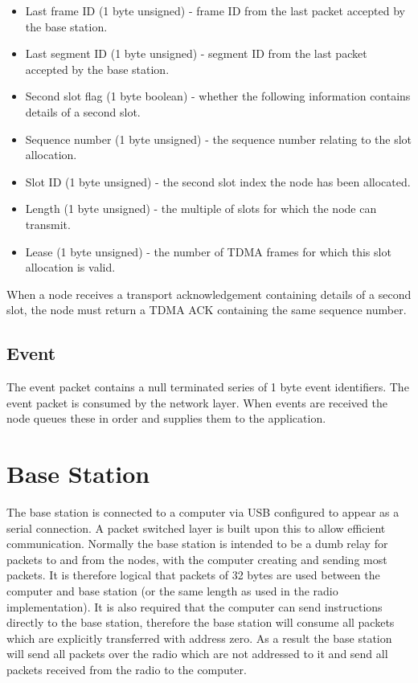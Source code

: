 \documentclass[parskip]{cs4rep}
\begin{document}
\begin{itemize}
\item
Last frame ID (1 byte unsigned) - frame ID from the last packet accepted by the base station.
\item
Last segment ID (1 byte unsigned) - segment ID from the last packet accepted by the base station.
\item
Second slot flag (1 byte boolean) - whether the following information contains details of a second slot.
\item
Sequence number (1 byte unsigned) - the sequence number relating to the slot allocation.
\item
Slot ID (1 byte unsigned) - the second slot index the node has been allocated.
\item
Length (1 byte unsigned) - the multiple of slots for which the node can transmit.
\item
Lease (1 byte unsigned) - the number of TDMA frames for which this slot allocation is valid.
\end{itemize}

When a node receives a transport acknowledgement containing details of a second slot, the node must return a TDMA ACK containing the same sequence number.

\subsection{Event}

The event packet contains a null terminated series of 1 byte event identifiers. The event packet is consumed by the network layer. When events are received the node queues these in order and supplies them to the application.

\section{Base Station}

The base station is connected to a computer via USB configured to appear as a serial connection. A packet switched layer is built upon this to allow efficient communication. Normally the base station is intended to be a dumb relay for packets to and from the nodes, with the computer creating and sending most packets. It is therefore logical that packets of 32 bytes are used between the computer and base station (or the same length as used in the radio implementation). It is also required that the computer can send instructions directly to the base station, therefore the base station will consume all packets which are explicitly transferred with address zero. As a result the base station will send all packets over the radio which are not addressed to it and send all packets received from the radio to the computer.
\end{document}
